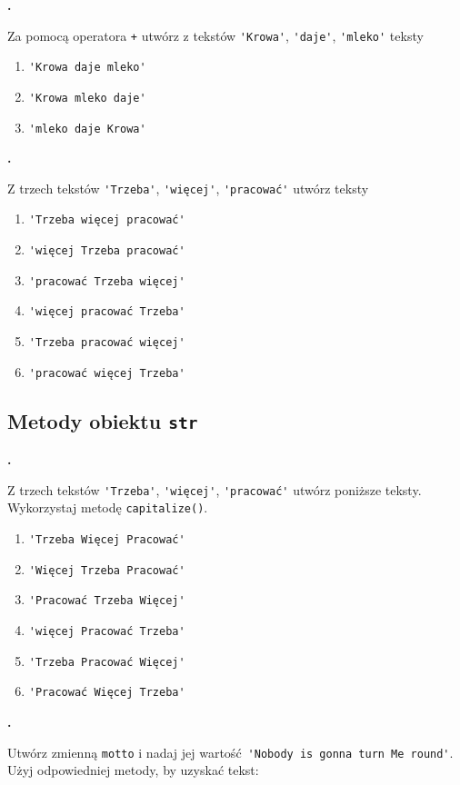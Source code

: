 \documentclass[a4paper]{article}
\begin{document}
\textbf{.}\addtocounter{zadanie}{1} Za pomocą operatora \verb|+| utwórz z tekstów \verb|'Krowa'|, \verb|'daje'|, \verb|'mleko'| teksty
\begin{enumerate}[label=\arabic*.]
    \item \verb|'Krowa daje mleko'|
    \item \verb|'Krowa mleko daje'|
    \item \verb|'mleko daje Krowa'|
\end{enumerate}


\textbf{.}\addtocounter{zadanie}{1} Z trzech tekstów \verb|'Trzeba'|, \verb|'więcej'|, \verb|'pracować'| utwórz teksty
\begin{enumerate}[label=\arabic*.]
    \item \verb|'Trzeba więcej pracować'|
    \item \verb|'więcej Trzeba pracować'|
    \item \verb|'pracować Trzeba więcej'|
    \item \verb|'więcej pracować Trzeba'|
    \item \verb|'Trzeba pracować więcej'|
    \item \verb|'pracować więcej Trzeba'|
\end{enumerate}

\subsection{Metody obiektu \texttt{str}}

\textbf{.}\addtocounter{zadanie}{1} Z trzech tekstów \verb|'Trzeba'|, \verb|'więcej'|, \verb|'pracować'| utwórz poniższe teksty. Wykorzystaj metodę \verb|capitalize()|.
\begin{enumerate}[label=\arabic*.]
    \item \verb|'Trzeba Więcej Pracować'|
    \item \verb|'Więcej Trzeba Pracować'|
    \item \verb|'Pracować Trzeba Więcej'|
    \item \verb|'więcej Pracować Trzeba'|
    \item \verb|'Trzeba Pracować Więcej'|
    \item \verb|'Pracować Więcej Trzeba'|
\end{enumerate}


\textbf{.}\addtocounter{zadanie}{1} Utwórz zmienną \verb|motto| i nadaj jej wartość \verb|'Nobody is gonna turn Me round'|. Użyj odpowiedniej metody, by uzyskać tekst:
\end{document}
